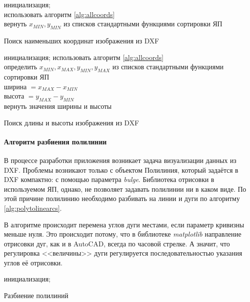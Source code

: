 \begin{algorithm}[H]
	\SetAlgoLined
	инициализация;\\
	использовать алгоритм \ref{alg:allcoords}\\
	вернуть $x_{MIN}, y_{MIN}$ из списков стандартными функциями сортировки ЯП
	\caption{Поиск наименьших координат изображения из DXF}
	\label{alg:extremums}
\end{algorithm}

\begin{algorithm}[H]
	\SetAlgoLined
	инициализация;
	использовать алгоритм \ref{alg:allcoords}\\
	определить $x_{MIN}, x_{MAX}, y_{MIN}, y_{MAX}$ из списков стандартными функциями сортировки ЯП\\
	ширина $=x_{MAX}-x_{MIN}$\\
	высота $=y_{MAX}-y_{MIN}$\\
	вернуть значения ширины и высоты
	\caption{Поиск длины и высоты изображения из DXF}
	\label{alg:dimes}
\end{algorithm}

\paragraph{Алгоритм разбиения полилинии}
В процессе разработки приложения возникает задача визуализации данных из DXF. Проблемы возникают только с объектом Полилиния, который задаётся в DXF компактно: с помощью параметра \textit{bulge}. Библиотека отрисовки в используемом ЯП, однако, не позволяет задавать полилинии ни в каком виде. По этой причине полилинию необходимо разбивать на линии и дуги по алгоритму \ref{alg:polytolinearcs}.

В алгоритме происходит перемена углов дуги местами, если параметр кривизны меньше нуля. Это происходит потому, что в библиотеке \textit{matplotlib} направление отрисовки дуг, как и в AutoCAD, всегда по часовой стрелке. А значит, что регулировка <<величины>> дуги регулируется последовательностью указания углов её отрисовки.

\begin{algorithm}[H]
	\SetAlgoLined
	инициализация;
	\caption{Разбиение полилиний}
	\label{alg:polytolinearcs}
\end{algorithm}

